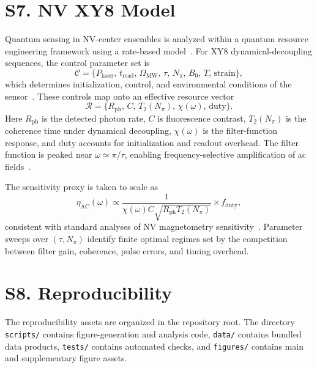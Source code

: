 \documentclass[12pt]{article}
\begin{document}
\section*{S7. NV XY8 Model}

Quantum sensing in NV-center ensembles is analyzed within a quantum resource
engineering framework using a rate-based model~\cite{NVRateModel2023,Degen2017,Barry2020}.
For XY8 dynamical-decoupling sequences, the control parameter set is
\begin{equation}
\mathcal{C} =
\{P_{\mathrm{laser}},\, t_{\mathrm{read}},\, \Omega_{\mathrm{MW}},\,
\tau,\, N_{\pi},\, B_0,\, T,\, \mathrm{strain}\},
\end{equation}
which determines initialization, control, and environmental conditions of the
sensor~\cite{Casola2018}. These controls map onto an effective resource vector
\begin{equation}
\mathcal{R} =
\{R_{\mathrm{ph}},\, C,\, T_2(N_{\pi}),\, \chi(\omega),\, \mathrm{duty}\}.
\end{equation}
Here $R_{\mathrm{ph}}$ is the detected photon rate, $C$ is fluorescence contrast,
$T_2(N_{\pi})$ is the coherence time under dynamical decoupling, $\chi(\omega)$
is the filter-function response, and $\mathrm{duty}$ accounts for initialization
and readout overhead. The filter function is peaked near $\omega\simeq\pi/\tau$,
enabling frequency-selective amplification of ac fields~\cite{Cywinski2008}.

The sensitivity proxy is taken to scale as
\begin{equation}
\eta_{\mathrm{AC}}(\omega)
\propto
\frac{1}{\chi(\omega)C\sqrt{R_{\mathrm{ph}}T_2(N_{\pi})}}
\times f_{\mathrm{duty}},
\end{equation}
consistent with standard analyses of NV magnetometry sensitivity~\cite{Degen2017,Barry2020}.
Parameter sweeps over $(\tau,N_{\pi})$ identify finite optimal regimes set by
the competition between filter gain, coherence, pulse errors, and timing overhead.

\section*{S8. Reproducibility}

The reproducibility assets are organized in the repository root. The directory
\texttt{scripts/} contains figure-generation and analysis code, \texttt{data/}
contains bundled data products, \texttt{tests/} contains automated checks, and
\texttt{figures/} contains main and supplementary figure assets.
\end{document}
